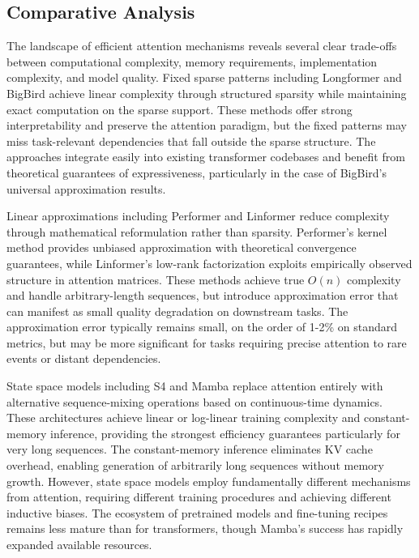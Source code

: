 \subsection{Comparative Analysis}

The landscape of efficient attention mechanisms reveals several clear trade-offs between computational complexity, memory requirements, implementation complexity, and model quality. Fixed sparse patterns including Longformer and BigBird achieve linear complexity through structured sparsity while maintaining exact computation on the sparse support. These methods offer strong interpretability and preserve the attention paradigm, but the fixed patterns may miss task-relevant dependencies that fall outside the sparse structure. The approaches integrate easily into existing transformer codebases and benefit from theoretical guarantees of expressiveness, particularly in the case of BigBird's universal approximation results.

Linear approximations including Performer and Linformer reduce complexity through mathematical reformulation rather than sparsity. Performer's kernel method provides unbiased approximation with theoretical convergence guarantees, while Linformer's low-rank factorization exploits empirically observed structure in attention matrices. These methods achieve true $O(n)$ complexity and handle arbitrary-length sequences, but introduce approximation error that can manifest as small quality degradation on downstream tasks. The approximation error typically remains small, on the order of 1-2\% on standard metrics, but may be more significant for tasks requiring precise attention to rare events or distant dependencies.

State space models including S4 and Mamba replace attention entirely with alternative sequence-mixing operations based on continuous-time dynamics. These architectures achieve linear or log-linear training complexity and constant-memory inference, providing the strongest efficiency guarantees particularly for very long sequences. The constant-memory inference eliminates KV cache overhead, enabling generation of arbitrarily long sequences without memory growth. However, state space models employ fundamentally different mechanisms from attention, requiring different training procedures and achieving different inductive biases. The ecosystem of pretrained models and fine-tuning recipes remains less mature than for transformers, though Mamba's success has rapidly expanded available resources.

